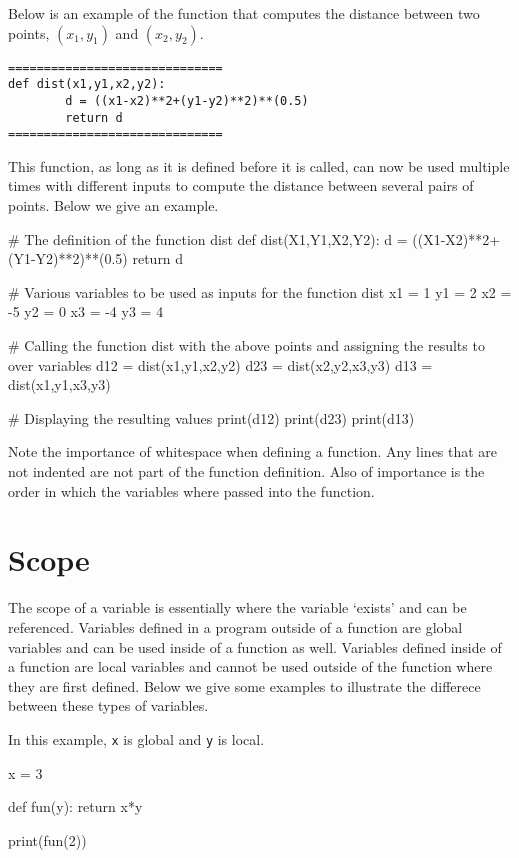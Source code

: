 \documentclass{ximera}
\begin{document}
Below is an example of the function that computes the distance between two points, $(x_1,y_1)$ and $(x_2,y_2)$.

\begin{verbatim}
==============================
def dist(x1,y1,x2,y2):
        d = ((x1-x2)**2+(y1-y2)**2)**(0.5)
        return d
==============================
\end{verbatim}

This function, as long as it is defined before it is called, can now be used multiple times with different inputs to compute the distance between several pairs of points. Below we give an example.

\begin{sageCell}
# The definition of the function dist	
def dist(X1,Y1,X2,Y2):
        d = ((X1-X2)**2+(Y1-Y2)**2)**(0.5)
        return d

# Various variables to be used as inputs for the function dist
x1 = 1
y1 = 2
x2 = -5
y2 = 0
x3 = -4
y3 = 4

# Calling the function dist with the above points and assigning the results to over variables
d12 = dist(x1,y1,x2,y2)
d23 = dist(x2,y2,x3,y3)
d13 = dist(x1,y1,x3,y3)
	
# Displaying the resulting values
print(d12)
print(d23)
print(d13)
\end{sageCell}

Note the importance of whitespace when defining a function. Any lines that are not indented are not part of the function definition. Also of importance is the order in which the variables where passed into the function.

\section{Scope}

The scope of a variable is essentially where the variable `exists' and can be referenced. Variables defined in a program outside of a function are global variables and can be used inside of a function as well. Variables defined inside of a function are local variables and cannot be used outside of the function where they are first defined. Below we give some examples to illustrate the differece between these types of variables.

In this example, \verb|x| is global and \verb|y| is local.

\begin{sageCell}
x = 3

def fun(y):
        return x*y

print(fun(2))
\end{sageCell}
\end{document}
